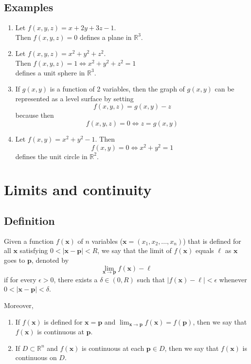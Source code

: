 \documentclass[11pt]{article}
\newcommand{\reals}{\mathbb{R}}
\renewcommand{\vec}[1]{\mathbf{#1}}
\begin{document}
\subsection{Examples}
\begin{enumerate}[ (a) ]
\item Let $f(x, y, z) = x + 2y + 3z - 1$.\\
Then $f(x, y, z) = 0$ defines a plane in $\reals^3$.

\item Let $f(x, y, z) = x^2 + y^2 + z^2$.\\
Then $f(x, y, z) = 1 \Leftrightarrow x^2 + y^2 + z^2 = 1$\\
defines a unit sphere in $\reals^3$.

\item If $g(x, y)$ is a function of 2 variables, then the graph of $g(x ,y)$ can be represented as a level surface by setting 
\[ f(x ,y ,z) = g(x, y) - z \]
because then
\[ f(x, y, z) = 0 \Leftrightarrow z = g(x, y) \]

\item Let $f(x, y) =  x^2 + y^2 - 1$. Then
\[ f(x, y) = 0 \Leftrightarrow x^2 + y^2 = 1 \]
defines the unit circle in $\reals^2$.
\end{enumerate}

\section{Limits and continuity}
\subsection{Definition}
Given a function $f(\vec{x})$ of $n$ variables ($\vec{x} = (x_1, x_2, ..., x_n)$) that is defined for all $\vec{x}$ satisfying $0 < |\vec{x} - \vec{p}| < R$, we say that the limit of $f(\vec{x})$ equals $\ell$ as $\vec{x}$ goes to $\vec{p}$, denoted by
\[ \lim_{\vec{x} \rightarrow \vec{p}} f(\vec{x}) - \ell \]
if for every $\epsilon > 0$, there exists a $\delta \in (0, R)$ such that $|f(\vec{x}) - \ell| < \epsilon$ whenever $0 < |\vec{x} - \vec{p}| < \delta$.

Moreover,
\begin{enumerate}[ (i) ]
\item If $f(\vec{x})$ is defined for $\vec{x} = \vec{p}$ and $\displaystyle{ \lim_{\vec{x} \rightarrow \vec{p}} f(\vec{x}) = f(\vec{p}) }$, then we say that $f(\vec{x})$ is continuous at $\vec{p}$.

\item If $D \subset \reals^n$ and $f(\vec{x})$ is continuous at each $\vec{p}\in D$, then we say that $f(\vec{x})$ is continuous on $D$.
\end{enumerate}
\end{document}
